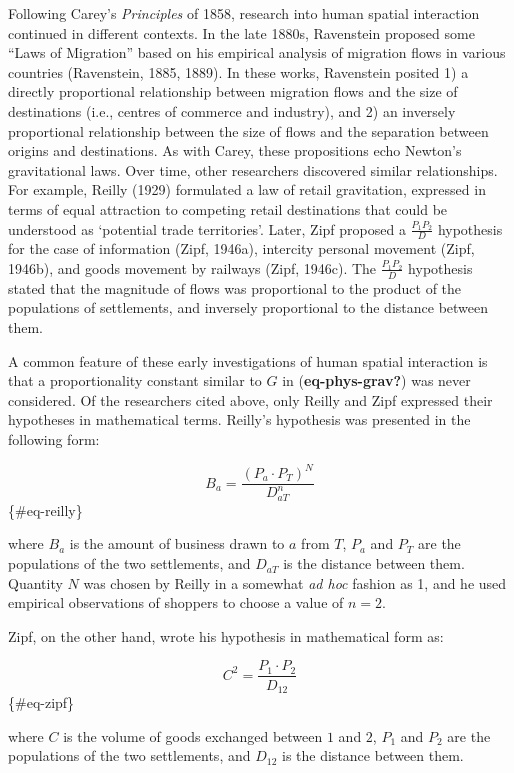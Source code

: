 \documentclass[
11pt, %
oneside, %
english, %
singlespacing, %
]{macthesis} %
\begin{document}
Following Carey's \emph{Principles} of 1858, research into human spatial interaction continued in different contexts. In the late 1880s, Ravenstein proposed some ``Laws of Migration'' based on his empirical analysis of migration flows in various countries (Ravenstein, 1885, 1889). In these works, Ravenstein posited 1) a directly proportional relationship between migration flows and the size of destinations (i.e., centres of commerce and industry), and 2) an inversely proportional relationship between the size of flows and the separation between origins and destinations. As with Carey, these propositions echo Newton's gravitational laws. Over time, other researchers discovered similar relationships. For example, Reilly (1929) formulated a law of retail gravitation, expressed in terms of equal attraction to competing retail destinations that could be understood as `potential trade territories'. Later, Zipf proposed a \(\frac{P_1P_2}{D}\) hypothesis for the case of information (Zipf, 1946a), intercity personal movement (Zipf, 1946b), and goods movement by railways (Zipf, 1946c). The \(\frac{P_1P_2}{D}\) hypothesis stated that the magnitude of flows was proportional to the product of the populations of settlements, and inversely proportional to the distance between them.

A common feature of these early investigations of human spatial interaction is that a proportionality constant similar to \(G\) in (\textbf{eq-phys-grav?}) was never considered. Of the researchers cited above, only Reilly and Zipf expressed their hypotheses in mathematical terms. Reilly's hypothesis was presented in the following form:

\[
B_a = \frac{(P_a\cdot P_T)^N}{D_{aT}^n}
\] \{\#eq-reilly\}

\noindent where \(B_a\) is the amount of business drawn to \(a\) from \(T\), \(P_a\) and \(P_T\) are the populations of the two settlements, and \(D_{aT}\) is the distance between them. Quantity \(N\) was chosen by Reilly in a somewhat \emph{ad hoc} fashion as 1, and he used empirical observations of shoppers to choose a value of \(n = 2\).

Zipf, on the other hand, wrote his hypothesis in mathematical form as:

\[
C^2 = \frac{P_1\cdot P_2}{D_{12}}
\] \{\#eq-zipf\}

\noindent where \(C\) is the volume of goods exchanged between \(1\) and \(2\), \(P_1\) and \(P_2\) are the populations of the two settlements, and \(D_{12}\) is the distance between them.
\end{document}
